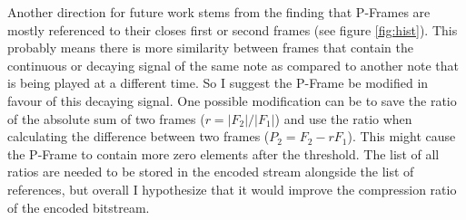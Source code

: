 Another direction for  future work stems from the finding that P-Frames are mostly referenced to their closes first or second frames (see figure \ref{fig:hist}). This probably means there is more similarity between frames that contain the continuous or decaying signal of the same note as compared to another note that is being played at a different time. So I suggest the P-Frame be modified in favour of this decaying signal. One possible modification can be to save the ratio of the absolute sum of two frames ($r = |F_2|/|F_1|$) and use the ratio when calculating the difference between two frames ($P_2=F_2-rF_1$). This might cause the P-Frame to contain more zero elements after the threshold. The list of all ratios are needed to be stored in the encoded stream alongside the list of references, but overall I hypothesize that it would improve the compression ratio of the encoded bitstream.






